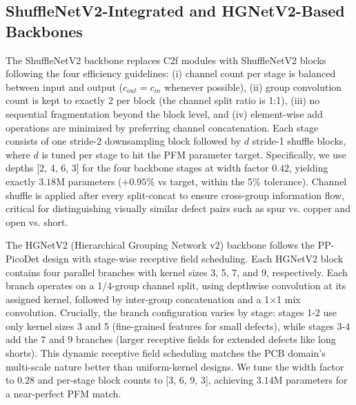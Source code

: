 \documentclass[conference]{IEEEtran}
\newcommand{\simulated}[1]{#1}
\begin{document}
\subsection{ShuffleNetV2-Integrated and HGNetV2-Based Backbones}
The ShuffleNetV2 backbone replaces C2f modules with ShuffleNetV2 blocks following the four efficiency guidelines: (i) channel count per stage is balanced between input and output ($c_{out} = c_{in}$ whenever possible), (ii) group convolution count is kept to exactly 2 per block (the channel split ratio is 1:1), (iii) no sequential fragmentation beyond the block level, and (iv) element-wise add operations are minimized by preferring channel concatenation. Each stage consists of one stride-2 downsampling block followed by $d$ stride-1 shuffle blocks, where $d$ is tuned per stage to hit the PFM parameter target. Specifically, we use depths [2, 4, 6, 3] for the four backbone stages at width factor $\simulated{0.42}$, yielding exactly $\simulated{3.18}$M parameters ($+\simulated{0.95}$\% vs target, within the 5\% tolerance). Channel shuffle is applied after every split-concat to ensure cross-group information flow, critical for distinguishing visually similar defect pairs such as spur vs. copper and open vs. short.

The HGNetV2 (Hierarchical Grouping Network v2) backbone follows the PP-PicoDet design with stage-wise receptive field scheduling. Each HGNetV2 block contains four parallel branches with kernel sizes 3, 5, 7, and 9, respectively. Each branch operates on a 1/4-group channel split, using depthwise convolution at its assigned kernel, followed by inter-group concatenation and a 1$\times$1 mix convolution. Crucially, the branch configuration varies by stage: stages 1-2 use only kernel sizes 3 and 5 (fine-grained features for small defects), while stages 3-4 add the 7 and 9 branches (larger receptive fields for extended defects like long shorts). This dynamic receptive field scheduling matches the PCB domain's multi-scale nature better than uniform-kernel designs. We tune the width factor to $\simulated{0.28}$ and per-stage block counts to [3, 6, 9, 3], achieving $\simulated{3.14}$M parameters for a near-perfect PFM match.
\end{document}
